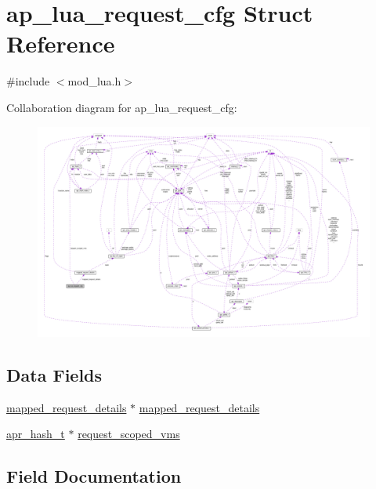 \hypertarget{structap__lua__request__cfg}{}\section{ap\+\_\+lua\+\_\+request\+\_\+cfg Struct Reference}
\label{structap__lua__request__cfg}


{\ttfamily \#include $<$mod\+\_\+lua.\+h$>$}



Collaboration diagram for ap\+\_\+lua\+\_\+request\+\_\+cfg\+:
\nopagebreak
\begin{figure}[H]
\begin{center}
\leavevmode
\includegraphics[width=350pt]{structap__lua__request__cfg__coll__graph}
\end{center}
\end{figure}
\subsection*{Data Fields}
\begin{DoxyCompactItemize}
\item 
\hyperlink{structmapped__request__details}{mapped\+\_\+request\+\_\+details} $\ast$ \hyperlink{structap__lua__request__cfg_ab57350a11763e1efce1022097c0d7c92}{mapped\+\_\+request\+\_\+details}
\item 
\hyperlink{structapr__hash__t}{apr\+\_\+hash\+\_\+t} $\ast$ \hyperlink{structap__lua__request__cfg_a7f3a31e3eb6ae100cc29c0a53024f79e}{request\+\_\+scoped\+\_\+vms}
\end{DoxyCompactItemize}


\subsection{Field Documentation}

